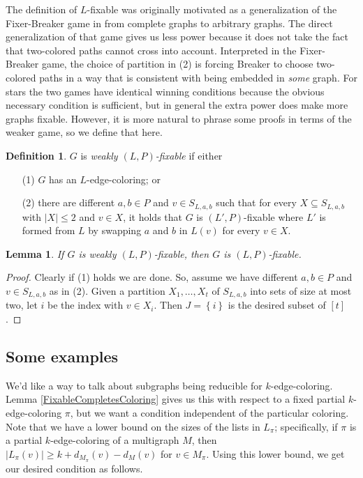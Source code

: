 \documentclass[12pt]{article}
\theoremstyle{plain}
\newtheorem{lem}[thm]{Lemma}
\theoremstyle{definition}
\newtheorem{defn}{Definition}
\theoremstyle{remark}
\newcommand{\set}[1]{\left\{ #1 \right\}}
\newcommand{\irange}[1]{\left[#1\right]}
\begin{document}
The definition of $L$-fixable was originally motivated as a generalization of the Fixer-Breaker game in \cite{HallGame} from complete graphs to arbitrary graphs.  
The direct generalization of that game gives us less power because it does not take the fact that two-colored paths cannot cross into account.  Interpreted in the Fixer-Breaker game, the choice of partition
in (2) is forcing Breaker to choose two-colored paths in a way that is consistent with being embedded in \emph{some} graph.  For stars the two games have identical winning conditions because the obvious necessary condition is sufficient, but in general the extra power does make more graphs fixable.  However, it is more natural to phrase some proofs in terms of the weaker game, so we define that here.

\begin{defn}
$G$ is \emph{weakly $(L, P)$-fixable} if either
\begin{enumerate}
\item[(1)] $G$ has an $L$-edge-coloring; or
\item[(2)] there are different $a,b \in P$ and $v \in S_{L,a,b}$ such that for every $X \subseteq S_{L,a,b}$ with $|X| \le 2$ and $v \in X$, it holds that $G$ is $(L', P)$-fixable where $L'$ is formed from $L$ by swapping $a$ and $b$ in $L(v)$ for every $v \in X$.
\end{enumerate}
\end{defn}

\begin{lem}\label{weaklyfixable}
If $G$ is weakly $(L, P)$-fixable, then $G$ is $(L, P)$-fixable.
\end{lem}
\begin{proof}
Clearly if (1) holds we are done.  So, assume we have different $a,b \in P$ and $v \in S_{L,a,b}$ as in (2). Given a partition $X_1, \ldots, X_t$ of $S_{L,a,b}$ into sets of size at most two, let $i$ be the index with $v \in X_i$.  Then $J = \set{i}$ is the desired subset of $\irange{t}$.
\end{proof}

\subsection{Some examples}
We'd like a way to talk about subgraphs being reducible for $k$-edge-coloring.  Lemma \ref{FixableCompletesColoring} gives us this with respect to a fixed partial $k$-edge-coloring $\pi$, but we want a condition independent of the particular coloring.  
Note that we have a lower bound on the sizes of the lists in $L_\pi$; specifically, if $\pi$ is a partial $k$-edge-coloring of a multigraph $M$, then $|L_{\pi}(v)| \ge k + d_{M_\pi}(v) - d_M(v)$ for $v \in M_{\pi}$. Using this lower bound, we get our desired condition as follows.
\end{document}
